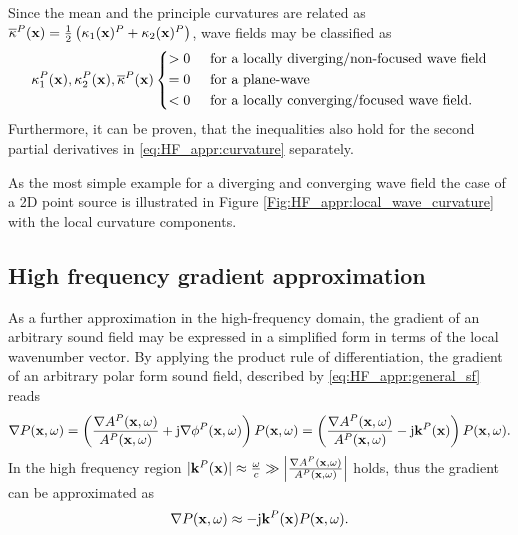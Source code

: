 Since the mean and the principle curvatures are related as $\overline{\kappa}^P(\mathbf{x})  = \frac{1}{2} \left( \kappa_1(\mathbf{x})^P+\kappa_2(\mathbf{x})^P \right)$, wave fields may be classified as
\begin{equation}
\label{eq:HF_appr:curvature_cases}
\kappa_1^P(\vx),\kappa_2^P(\vx),\overline{\kappa}^P(\vx) 
\begin{cases*}
> 0  \hspace{5mm} \text{for a locally diverging/non-focused wave field} \\
= 0  \hspace{5mm} \text{for a plane-wave}  \\
< 0  \hspace{5mm} \text{for a locally converging/focused wave field.} 
\end{cases*}
\end{equation}
Furthermore, it can be proven, that the inequalities also hold for the second partial derivatives in \eqref{eq:HF_appr:curvature} separately.

As the most simple example for a diverging and converging wave field the case of a 2D point source is illustrated in Figure \ref{Fig:HF_appr:local_wave_curvature} with the local curvature components.

\subsection{High frequency gradient approximation}
As a further approximation in the high-frequency domain, the gradient of an arbitrary sound field may be expressed in a simplified form in terms of the local wavenumber vector.
By applying the product rule of differentiation, the gradient of an arbitrary polar form sound field, described by \eqref{eq:HF_appr:general_sf} reads
\begin{equation}
\nabla P(\mathbf{x},\omega) = \left(  \frac{\nabla A^P(\mathbf{x},\omega)}{A^P(\mathbf{x},\omega)} + \mathrm{j} \nabla \phi^P(\mathbf{x},\omega) \right) P(\mathbf{x},\omega) =  \left(  \frac{\nabla A^P(\mathbf{x},\omega)}{A^P(\mathbf{x},\omega)} - \mathrm{j} \mathbf{k}^P(\mathbf{x}) \right) P(\mathbf{x},\omega).
\end{equation}
In the high frequency region $|\mathbf{k}^P(\mathbf{x})| \approx \frac{\omega}{c} \gg \left| \frac{ \nabla A^P(\mathbf{x},\omega)}{A^P(\mathbf{x},\omega)} \right|$ holds, thus the gradient can be approximated as
\begin{equation}
\nabla P(\mathbf{x},\omega) \approx - \mathrm{j} \mathbf{k}^P(\mathbf{x}) P(\mathbf{x},\omega).
\label{eq:HF_approx:gradient_appr}
\end{equation}

